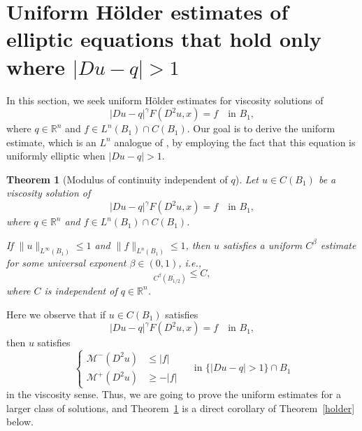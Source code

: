 \documentclass[11pt]{amsart}
\theoremstyle{plain}
\newtheorem{theorem}{Theorem}[section]
\theoremstyle{definition}
\numberwithin{equation}{section}
\begin{document}
\section{Uniform H{\"o}lder estimates of elliptic equations that hold only where \texorpdfstring{$|Du-q|>1$}{|Du-q|>1}} \label{sec3}
In this section, we seek uniform H{\"o}lder estimates for viscosity solutions of 
\begin{equation*}
    |Du-q|^\gamma F(D^2u, x) =f \quad \text{in $B_1$},
\end{equation*}
where $q \in \mathbb{R}^n$ and $f\in L^n(B_1) \cap C(B_1)$. Our goal is to derive the uniform estimate, which is an $L^n$ analogue of \cite[Lemma~3]{IS13}, by employing the fact that this equation is uniformly elliptic when $|Du-q|>1$. 

\begin{theorem}[Modulus of continuity independent of $q$]\label{lem-equicontinuity}
    Let $u \in C(B_1)$ be a viscosity solution of
    \begin{equation*}
        |Du-q|^{\gamma}F(D^2u, x)=f \quad \text{in $B_1$},
    \end{equation*}
    where $q \in \mathbb{R}^n$ and $f \in L^n(B_1) \cap C(B_1)$.

    If $\|u\|_{L^{\infty}(B_1)} \leq 1$ and $\|f\|_{L^n(B_1)} \leq 1$, then $u$ satisfies a uniform $C^{\beta}$ estimate for some universal exponent $\beta \in (0,1)$, i.e.,
    \begin{equation*}
        [u]_{C^{\beta}(\overline{B_{1/2}})} \leq C,
    \end{equation*}
    where $C$ is independent of $q \in \mathbb{R}^n$.
\end{theorem}


    Here we observe that if $u \in C(B_1)$ satisfies 
    \begin{equation*}
        |Du-q|^{\gamma}F(D^2u, x)=f \quad \text{in $B_1$},
    \end{equation*}
    then $u$ satisfies
     \begin{equation*}
     \left\{
             \begin{aligned}
                 \mathcal{M}^-(D^2u) &\leq |f|\\
                  \mathcal{M}^+(D^2u)&\geq -|f| 
             \end{aligned}
             \right.
             \quad \text{ in } \{|Du-q|>1\} \cap B_1 
    \end{equation*}
    in the viscosity sense. Thus, we are going to prove the uniform estimates for a larger class of solutions, and Theorem~\ref{lem-equicontinuity} is a direct corollary of Theorem~\ref{holder} below.
\end{document}
